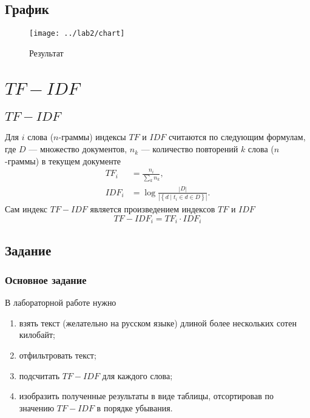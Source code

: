 \lstset{inputencoding=utf8, extendedchars=\true}


\section{График}
\begin{figure}[h]
  \centering
  \texttt{[image: ../lab2/chart]}
  \caption{Результат}
\end{figure}

\chapter{$TF-IDF$}

\section{$TF-IDF$}
Для $i$ слова ($n$-граммы) индексы $TF$ и $IDF$ считаются
по следующим формулам, где
$D$ --- множество документов,
$n_k$ --- количество повторений $k$ слова ($n$-граммы) в текущем документе
\cite{Jones}
\begin{equation*}
  \begin{split}
    TF_i  &= \frac{n_i}{\sum_{k} n_k}, \\
    IDF_i &= \log {\frac{\left| D \right|}{
                   \left| \left\{ d \mid t_i \in d \in D \right\} \right|}}.
  \end{split}
\end{equation*}
Сам индекс $TF-IDF$ является произведением индексов $TF$ и $IDF$
\begin{equation*}
  TF-IDF_i = TF_i \cdot IDF_i
\end{equation*}

\section{Задание}

\subsection{Основное задание}
В лабораторной работе нужно
\begin{enumerate}
  \item
    взять текст (желательно на русском языке)
    длиной более нескольких сотен килобайт;
  \item
    отфильтровать текст;
  \item
    подсчитать $TF-IDF$ для каждого слова;
  \item
    изобразить полученные результаты в виде таблицы,
    отсортировав по значению $TF-IDF$ в порядке убывания.
\end{enumerate}

